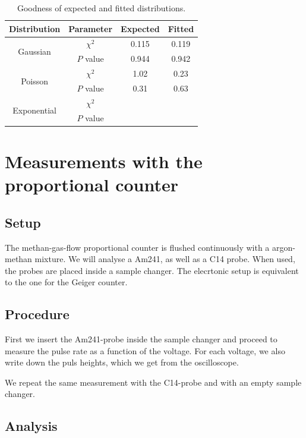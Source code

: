 \begin{table}[H]
	\renewcommand{\arraystretch}{1.5}
	\centering
	\begin{tabular}{|c|c|c|c|}
		\hline
		Distribution & Parameter & Expected & Fitted \\
		\hline
		\multirow{2}{*}{Gaussian} & $\chi^2$ & \SI{0.115}{} & \SI{0.119}{} \\
		 & $P$ value & \SI{0.944}{} & \SI{0.942}{} \\
		\hline
		\multirow{2}{*}{Poisson} & $\chi^2$ & \SI{1.02}{} & \SI{0.23}{} \\
		 & $P$ value & \SI{0.31}{} & \SI{0.63}{} \\
		\hline
		\multirow{2}{*}{Exponential} & $\chi^2$ & \SI{}{} & \SI{}{} \\
		 & $P$ value & \SI{}{} & \SI{}{} \\
		\hline
	\end{tabular}
	\caption{Goodness of expected and fitted distributions.}
	\label{tab:DistGood}
\end{table}

\section{Measurements with the proportional counter}

\subsection{Setup}

The methan-gas-flow proportional counter is flushed continuously with a argon-methan mixture. We will analyse a Am241, as well as a C14 probe. When used, the probes are placed inside a sample changer. The elecrtonic setup is equivalent to the one for the Geiger counter.

\subsection{Procedure}

First we insert the Am241-probe inside the sample changer and proceed to measure the pulse rate as a function of the voltage. For each voltage, we also write down the puls heights, which we get from the oscilloscope.

We repeat the same measurement with the C14-probe and with an empty sample changer.

\subsection{Analysis}

